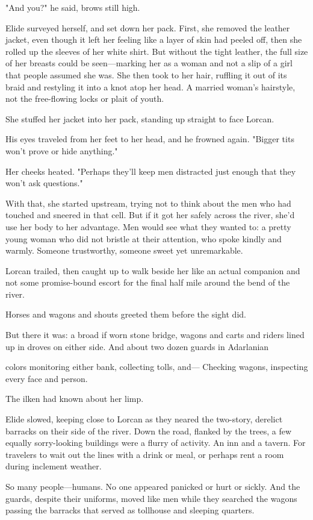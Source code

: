 "And you?" he said, brows still high.

Elide surveyed herself, and set down her pack. First, she removed the leather jacket, even though it left her feeling like a layer of skin had peeled off, then she rolled up the sleeves of her white shirt. But without the tight leather, the full size of her breasts could be seen---marking her as a woman and not a slip of a girl that people assumed she was. She then took to her hair, ruffling it out of its braid and restyling it into a knot atop her head. A married woman's hairstyle, not the free-flowing locks or plait of youth.

She stuffed her jacket into her pack, standing up straight to face Lorcan.

His eyes traveled from her feet to her head, and he frowned again. "Bigger tits won't prove or hide anything."

Her cheeks heated. "Perhaps they'll keep men distracted just enough that they won't ask questions."

With that, she started upstream, trying not to think about the men who had touched and sneered in that cell. But if it got her safely across the river, she'd use her body to her advantage. Men would see what they wanted to: a pretty young woman who did not bristle at their attention, who spoke kindly and warmly. Someone trustworthy, someone sweet yet unremarkable.

Lorcan trailed, then caught up to walk beside her like an actual companion and not some promise-bound escort for the final half mile around the bend of the river.

Horses and wagons and shouts greeted them before the sight did.

But there it was: a broad if worn stone bridge, wagons and carts and riders lined up in droves on either side. And about two dozen guards in Adarlanian

colors monitoring either bank, collecting tolls, and--- Checking wagons, inspecting every face and person.

The ilken had known about her limp.

Elide slowed, keeping close to Lorcan as they neared the two-story, derelict barracks on their side of the river. Down the road, flanked by the trees, a few equally sorry-looking buildings were a flurry of activity. An inn and a tavern. For travelers to wait out the lines with a drink or meal, or perhaps rent a room during inclement weather.

So many people---humans. No one appeared panicked or hurt or sickly. And the guards, despite their uniforms, moved like men while they searched the wagons passing the barracks that served as tollhouse and sleeping quarters.

